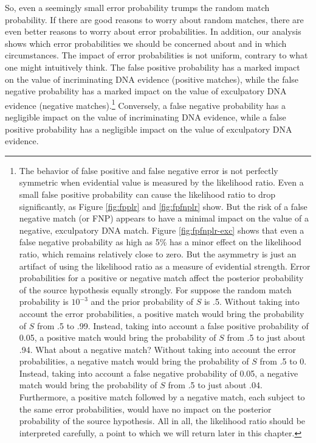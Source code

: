 \documentclass[
  10pt,
  dvipsnames,enabledeprecatedfontcommands]{scrartcl}
\begin{document}
So, even a seemingly small error probability trumps the random match
probability. If there are good reasons to worry about random matches,
there are even better reasons to worry about error probabilities. In
addition, our analysis shows which error probabilities we should be
concerned about and in which circumstances. The impact of error
probabilities is not uniform, contrary to what one might intuitively
think. The false positive probability has a marked impact on the value
of incriminating DNA evidence (positive matches), while the false
negative probability has a marked impact on the value of exculpatory DNA
evidence (negative matches).\footnote{The behavior of false positive and
  false negative error is not perfectly symmetric when evidential value
  is measured by the likelihood ratio. Even a small false positive
  probability can cause the likelihood ratio to drop significantly, as
  Figure \ref{fig:fpplr} and \ref{fig:fpfnplr} show. But the risk of a
  false negative match (or FNP) appears to have a minimal impact on the
  value of a negative, exculpatory DNA match. Figure
  \ref{fig:fpfnplr-exc} shows that even a false negative probability as
  high as 5\% has a minor effect on the likelihood ratio, which remains
  relatively close to zero. But the asymmetry is just an artifact of
  using the likelihood ratio as a measure of evidential strength. Error
  probabilities for a positive or negative match affect the posterior
  probability of the source hypothesis equally strongly. For suppose the
  random match probability is \(10^{-3}\) and the prior probability of
  \(S\) is .5. Without taking into account the error probabilities, a
  positive match would bring the probability of \(S\) from .5 to .99.
  Instead, taking into account a false positive probability of 0.05, a
  positive match would bring the probability of \(S\) from .5 to just
  about .94. What about a negative match? Without taking into account
  the error probabilities, a negative match would bring the probability
  of \(S\) from .5 to 0. Instead, taking into account a false negative
  probability of 0.05, a negative match would bring the probability of
  \(S\) from .5 to just about .04. Furthermore, a positive match
  followed by a negative match, each subject to the same error
  probabilities, would have no impact on the posterior probability of
  the source hypothesis. All in all, the likelihood ratio should be
  interpreted carefully, a point to which we will return later in this
  chapter.} Conversely, a false negative probability has a negligible
impact on the value of incriminating DNA evidence, while a false
positive probability has a negligible impact on the value of exculpatory
DNA evidence.
\end{document}
